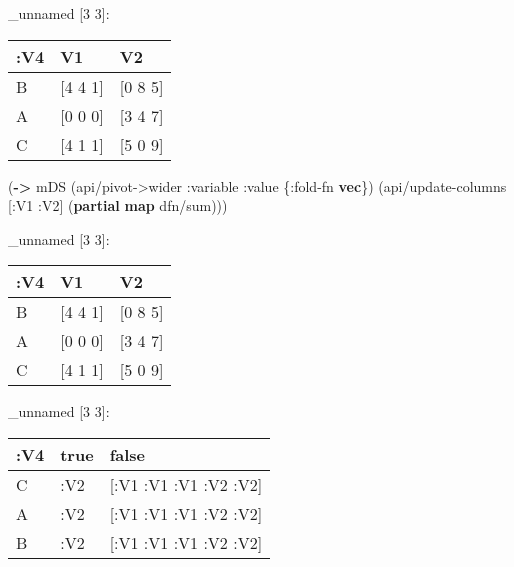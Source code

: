 \documentclass[]{article}
\newenvironment{Shaded}{\begin{snugshade}}{\end{snugshade}}
\newcommand{\KeywordTok}[1]{\textcolor[rgb]{0.13,0.29,0.53}{\textbf{#1}}}
\newcommand{\DecValTok}[1]{\textcolor[rgb]{0.00,0.00,0.81}{#1}}
\newcommand{\VariableTok}[1]{\textcolor[rgb]{0.00,0.00,0.00}{#1}}
\newcommand{\AttributeTok}[1]{\textcolor[rgb]{0.77,0.63,0.00}{#1}}
\newcommand{\NormalTok}[1]{#1}
\begin{document}
\_unnamed {[}3 3{]}:

\begin{longtable}[]{@{}lll@{}}
\toprule
:V4 & V1 & V2\tabularnewline
\midrule
\endhead
B & {[}4 4 1{]} & {[}0 8 5{]}\tabularnewline
A & {[}0 0 0{]} & {[}3 4 7{]}\tabularnewline
C & {[}4 1 1{]} & {[}5 0 9{]}\tabularnewline
\bottomrule
\end{longtable}

\begin{Shaded}
\begin{Highlighting}[]
\NormalTok{(}\KeywordTok{->}\NormalTok{ mDS}
\NormalTok{    (api/pivot->wider }\AttributeTok{:variable} \AttributeTok{:value}\NormalTok{ \{}\AttributeTok{:fold-fn} \KeywordTok{vec}\NormalTok{\})}
\NormalTok{    (api/update-columns [}\AttributeTok{:V1} \AttributeTok{:V2}\NormalTok{] (}\KeywordTok{partial} \KeywordTok{map}\NormalTok{ dfn/sum)))}
\end{Highlighting}
\end{Shaded}

\_unnamed {[}3 3{]}:

\begin{longtable}[]{@{}lll@{}}
\toprule
:V4 & V1 & V2\tabularnewline
\midrule
\endhead
B & {[}4 4 1{]} & {[}0 8 5{]}\tabularnewline
A & {[}0 0 0{]} & {[}3 4 7{]}\tabularnewline
C & {[}4 1 1{]} & {[}5 0 9{]}\tabularnewline
\bottomrule
\end{longtable}

\begin{Shaded}
\end{Shaded}

\_unnamed {[}3 3{]}:

\begin{longtable}[]{@{}lll@{}}
\toprule
:V4 & true & false\tabularnewline
\midrule
\endhead
C & :V2 & {[}:V1 :V1 :V1 :V2 :V2{]}\tabularnewline
A & :V2 & {[}:V1 :V1 :V1 :V2 :V2{]}\tabularnewline
B & :V2 & {[}:V1 :V1 :V1 :V2 :V2{]}\tabularnewline
\bottomrule
\end{longtable}
\end{document}
